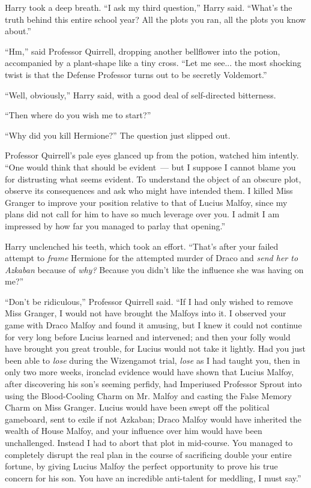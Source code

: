 Harry took a deep breath. ``I ask my third question,'' Harry said. ``What's the truth behind this entire school year? All the plots you ran, all the plots you know about.''

``Hm,'' said Professor Quirrell, dropping another bellflower into the potion, accompanied by a plant-shape like a tiny cross. ``Let me see... the most shocking twist is that the Defense Professor turns out to be secretly Voldemort.''

``Well, obviously,'' Harry said, with a good deal of self-directed bitterness.

``Then where do you wish me to start?''

``Why did you kill Hermione?'' The question just slipped out.

Professor Quirrell's pale eyes glanced up from the potion, watched him intently. ``One would think that should be evident~--- but I suppose I cannot blame you for distrusting what seems evident. To understand the object of an obscure plot, observe its consequences and ask who might have intended them. I killed Miss Granger to improve your position relative to that of Lucius Malfoy, since my plans did not call for him to have so much leverage over you. I admit I am impressed by how far you managed to parlay that opening.''

Harry unclenched his teeth, which took an effort. ``That's after your failed attempt to \emph{frame} Hermione for the attempted murder of Draco and \emph{send her to Azkaban} because of \emph{why?} Because you didn't like the influence she was having on me?''

``Don't be ridiculous,'' Professor Quirrell said. ``If I had only wished to remove Miss Granger, I would not have brought the Malfoys into it. I observed your game with Draco Malfoy and found it amusing, but I knew it could not continue for very long before Lucius learned and intervened; and then your folly would have brought you great trouble, for Lucius would not take it lightly. Had you just been able to \emph{lose} during the Wizengamot trial, \emph{lose} as I had taught you, then in only two more weeks, ironclad evidence would have shown that Lucius Malfoy, after discovering his son's seeming perfidy, had Imperiused Professor Sprout into using the Blood-Cooling Charm on Mr. Malfoy and casting the False Memory Charm on Miss Granger. Lucius would have been swept off the political gameboard, sent to exile if not Azkaban; Draco Malfoy would have inherited the wealth of House Malfoy, and your influence over him would have been unchallenged. Instead I had to abort that plot in mid-course. You managed to completely disrupt the real plan in the course of sacrificing double your entire fortune, by giving Lucius Malfoy the perfect opportunity to prove his true concern for his son. You have an incredible anti-talent for meddling, I must say.''


